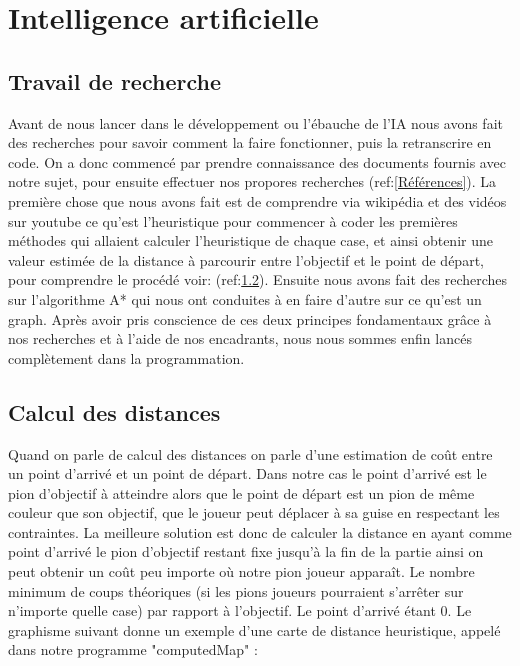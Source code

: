 \documentclass{rapportECL}
\begin{document}
\section{Intelligence artificielle}

\subsection{Travail de recherche}
Avant de nous lancer dans le développement ou l'ébauche de l'IA nous avons fait des recherches pour savoir comment la faire fonctionner, puis la retranscrire en code.
On a donc commencé par prendre connaissance des documents fournis avec notre sujet, pour ensuite effectuer nos propores recherches (ref:\ref{Références}).
\newline
La première chose que nous avons fait est de comprendre via wikipédia et des vidéos sur youtube ce qu'est l'heuristique pour commencer à coder les premières méthodes qui allaient calculer l'heuristique de chaque case, et ainsi obtenir une valeur estimée de la distance à parcourir entre l'objectif et le point de départ, pour comprendre le procédé voir: (ref:\ref{CD}).
\newline
Ensuite nous avons fait des recherches sur l'algorithme A* qui nous ont conduites à en faire d'autre sur ce qu'est un graph. Après avoir pris conscience de ces deux principes fondamentaux grâce à nos recherches et à l'aide de nos encadrants, nous nous sommes enfin lancés complètement dans la programmation.

\subsection{Calcul des distances}
\label{CD}

Quand on parle de calcul des distances on parle d'une estimation de coût entre un point d'arrivé et un point de départ. Dans notre cas le point d'arrivé est le pion d'objectif à atteindre alors que le point de départ est un pion de même couleur que son objectif, que le joueur peut déplacer à sa guise en respectant les contraintes. La meilleure solution est donc de calculer la distance en ayant comme point d'arrivé le pion d'objectif restant fixe jusqu'à la fin de la partie ainsi on peut obtenir un coût peu importe où notre pion joueur apparaît. 
\newline
Le nombre minimum de coups théoriques (si les pions joueurs pourraient s'arrêter sur n'importe quelle case) par rapport à l’objectif. Le point d'arrivé étant 0. Le graphisme suivant donne un exemple d’une carte de distance heuristique, appelé dans notre programme "computedMap" :
\end{document}

